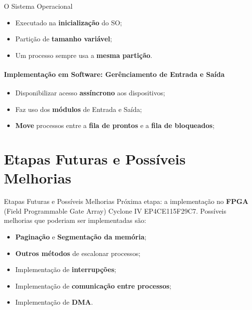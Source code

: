 \documentclass[aspectratio=169]{beamer}
\begin{document}
\begin{frame}{O Sistema Operacional}
{\begin{itemize}
				
				\vspace{0.5cm}
				
				\item Executado na \textbf{inicialização} do SO;
				\vspace{0.5cm}
				\item Partição de \textbf{tamanho variável};
				\vspace{0.5cm}
				\item Um processo sempre usa a \textbf{mesma partição}.
				
			\end{itemize}
		}
		{
			\framesubtitle{Implementação em Software: Gerênciamento de Entrada e Saída}
			\begin{itemize}
				\item Disponibilizar acesso \textbf{assíncrono} aos dispositivos;
				\vspace{0.5cm}
				\item Faz uso dos \textbf{módulos} de Entrada e Saída;
				\vspace{0.5cm}
				\item \textbf{Move} processos entre a \textbf{fila de prontos} e a \textbf{fila de bloqueados};
			\end{itemize}
		}
	\end{frame}
	
	
	
	\section{Etapas Futuras e Possíveis Melhorias}
	\begin{frame}{Etapas Futuras e Possíveis Melhorias}
		Próxima etapa: a implementação no \textbf{FPGA} (Field Programmable Gate Array) Cyclone IV EP4CE115F29C7.
		\vspace{0.5cm}
		Possíveis melhorias que poderiam ser implementadas são:
		
			\begin{itemize}
				\item \textbf{Paginação} e \textbf{Segmentação da memória};
				\vspace{0.5cm}
				\item \textbf{Outros métodos} de escalonar processos;
				\vspace{0.5cm}
				\item Implementação de \textbf{interrupções}; 
				\vspace{0.5cm}
				\item Implementação de \textbf{comunicação entre processos};
				\vspace{0.5cm}
				\item Implementação de \textbf{DMA}.
			\end{itemize}
	\end{frame}
	
	
	
\end{document}
